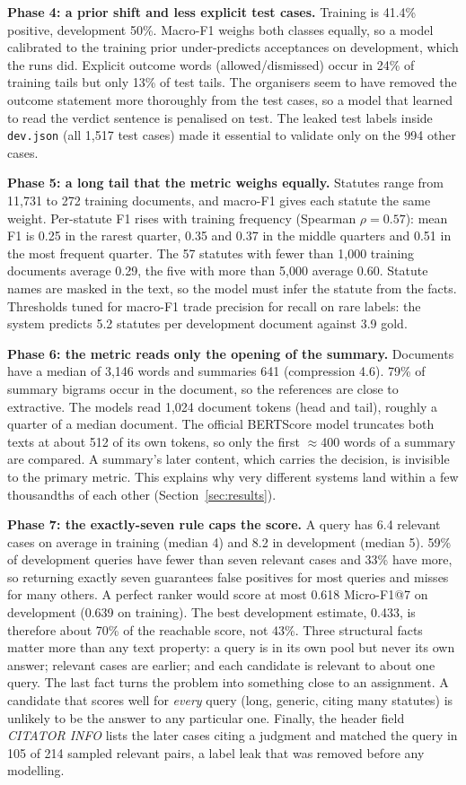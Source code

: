 \documentclass[11pt, oneside]{article}
\begin{document}
\textbf{Phase 4: a prior shift and less explicit test cases.} Training is 41.4\% positive, development 50\%.
Macro-F1 weighs both classes equally, so a model calibrated to the training prior under-predicts acceptances on
development, which the runs did. Explicit outcome words (allowed/dismissed) occur in 24\% of training tails but only
13\% of test tails. The organisers seem to have removed the outcome statement more thoroughly from the test cases,
so a model that learned to read the verdict sentence is penalised on test. The leaked test labels inside
\texttt{dev.json} (all 1{,}517 test cases) made it essential to validate only on the 994 other cases.

\textbf{Phase 5: a long tail that the metric weighs equally.} Statutes range from 11{,}731 to 272 training
documents, and macro-F1 gives each statute the same weight. Per-statute F1 rises with training frequency (Spearman
$\rho=0.57$): mean F1 is 0.25 in the rarest quarter, 0.35 and 0.37 in the middle quarters and 0.51 in the most frequent
quarter. The 57 statutes with fewer than 1{,}000 training documents average 0.29, the five with more than 5{,}000
average 0.60. Statute names are masked in the text, so the model must infer the statute from the facts. Thresholds
tuned for macro-F1 trade precision for recall on rare labels: the system predicts 5.2 statutes per development
document against 3.9 gold.

\textbf{Phase 6: the metric reads only the opening of the summary.} Documents have a median of 3{,}146 words and
summaries 641 (compression 4.6). 79\% of summary bigrams occur in the document, so the references are close to
extractive. The models read 1{,}024 document tokens (head and tail), roughly a quarter of a median document. The
official BERTScore model truncates both texts at about 512 of its own tokens, so only the first $\approx$400 words of
a summary are compared. A summary's later content, which carries the decision, is invisible to the primary metric.
This explains why very different systems land within a few thousandths of each other (Section~\ref{sec:results}).

\textbf{Phase 7: the exactly-seven rule caps the score.} A query has 6.4 relevant cases on average in training
(median 4) and 8.2 in development (median 5). 59\% of development queries have fewer than seven relevant cases and
33\% have more, so returning exactly seven guarantees false positives for most queries and misses for many others. A
perfect ranker would score at most 0.618 Micro-F1@7 on development (0.639 on training). The best development
estimate, 0.433, is therefore about 70\% of the reachable score, not 43\%. Three structural facts matter more than any text property: a query is in
its own pool but never its own answer; relevant cases are earlier; and each candidate is relevant to about one query.
The last fact turns the problem into something close to an assignment. A candidate that scores well for \emph{every}
query (long, generic, citing many statutes) is unlikely to be the answer to any particular one. Finally, the header
field \emph{CITATOR INFO} lists the later cases citing a judgment and matched the query in 105 of 214 sampled relevant
pairs, a label leak that was removed before any modelling.
\end{document}
